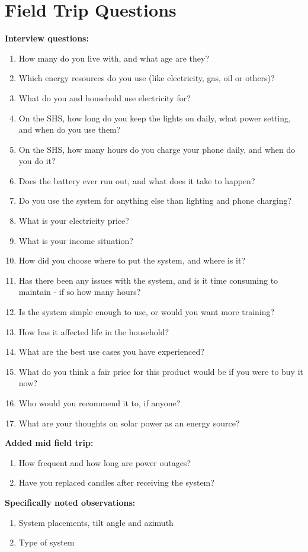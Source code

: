 \chapter{Field Trip Questions}
\label{apx:ftquestions}
{\footnotesize
\textbf{Interview questions:}
\begin{enumerate}
    \item How many do you live with, and what age are they?
    \item Which energy resources do you use (like electricity, gas, oil or others)?
    \item What do you and household use electricity for?
    \item On the SHS, how long do you keep the lights on daily, what power setting, and when do you use them?
    \item On the SHS, how many hours do you charge your phone daily, and when do you do it?
    \item Does the battery ever run out, and what does it take to happen?
    \item Do you use the system for anything else than lighting and phone charging?
    \item What is your electricity price?
    \item What is your income situation?
    \item How did you choose where to put the system, and where is it?
    \item Has there been any issues with the system, and is it time consuming to maintain - if so how many hours?
    \item Is the system simple enough to use, or would you want more training?
    \item How has it affected life in the household?
    \item What are the best use cases you have experienced?
    \item What do you think a fair price for this product would be if you were to buy it now?
    \item Who would you recommend it to, if anyone?
    \item What are your thoughts on solar power as an energy source?
\end{enumerate}
\textbf{Added mid field trip:}
\begin{enumerate}
    \item How frequent and how long are power outages?
    \item Have you replaced candles after receiving the system?
\end{enumerate}
\textbf{Specifically noted observations:}
\begin{enumerate}
    \item System placements, tilt angle and azimuth
    \item Type of system
\end{enumerate}}